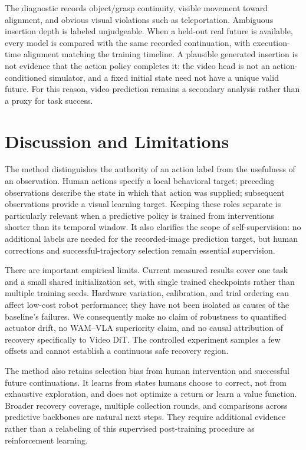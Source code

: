 \documentclass[letterpaper,10pt,conference]{ieeeconf}
\begin{document}
The diagnostic records object/grasp continuity, visible movement toward alignment, and obvious visual violations such as teleportation. Ambiguous insertion depth is labeled unjudgeable. When a held-out real future is available, every model is compared with the same recorded continuation, with execution-time alignment matching the training timeline. A plausible generated insertion is not evidence that the action policy completes it: the video head is not an action-conditioned simulator, and a fixed initial state need not have a unique valid future. For this reason, video prediction remains a secondary analysis rather than a proxy for task success.

\section{Discussion and Limitations}
The method distinguishes the authority of an action label from the usefulness of an observation. Human actions specify a local behavioral target; preceding observations describe the state in which that action was supplied; subsequent observations provide a visual learning target. Keeping these roles separate is particularly relevant when a predictive policy is trained from interventions shorter than its temporal window. It also clarifies the scope of self-supervision: no additional labels are needed for the recorded-image prediction target, but human corrections and successful-trajectory selection remain essential supervision.

There are important empirical limits. Current measured results cover one task and a small shared initialization set, with single trained checkpoints rather than multiple training seeds. Hardware variation, calibration, and trial ordering can affect low-cost robot performance; they have not been isolated as causes of the baseline's failures. We consequently make no claim of robustness to quantified actuator drift, no WAM--VLA superiority claim, and no causal attribution of recovery specifically to Video DiT. The controlled experiment samples a few offsets and cannot establish a continuous safe recovery region.

The method also retains selection bias from human intervention and successful future continuations. It learns from states humans choose to correct, not from exhaustive exploration, and does not optimize a return or learn a value function. Broader recovery coverage, multiple collection rounds, and comparisons across predictive backbones are natural next steps. They require additional evidence rather than a relabeling of this supervised post-training procedure as reinforcement learning.
\end{document}
